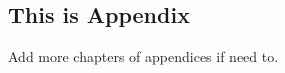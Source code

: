 \begin{appendices}


\chapter{This is Appendix}
Add more chapters of appendices if need to.

\end{appendices}